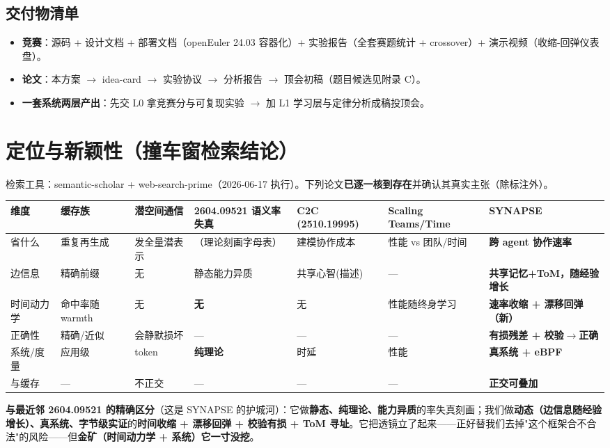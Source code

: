 \documentclass[UTF8,fontset=windows,11pt]{ctexart}
\newcommand{\key}[1]{\textbf{\textcolor{NavyBlue}{#1}}}
\begin{document}
\subsection{交付物清单}
\begin{itemize}
\item \key{竞赛}：源码 + 设计文档 + 部署文档（openEuler 24.03 容器化）+ 实验报告（全套赛题统计 + crossover）+ 演示视频（收缩-回弹仪表盘）。
\item \key{论文}：本方案 $\to$ idea-card $\to$ 实验协议 $\to$ 分析报告 $\to$ 顶会初稿（题目候选见附录 C）。
\item \key{一套系统两层产出}：先交 L0 拿竞赛分与可复现实验 $\to$ 加 L1 学习层与定律分析成稿投顶会。
\end{itemize}

\section{定位与新颖性（撞车窗检索结论）}
检索工具：semantic-scholar + web-search-prime（2026-06-17 执行）。下列论文\textbf{已逐一核到存在}并确认其真实主张（除标注外）。

{\scriptsize
\renewcommand{\arraystretch}{1.25}
\begin{tabularx}{\linewidth}{@{}p{1.4cm}YYYYY Y@{}}
\toprule
\textbf{维度} & \textbf{缓存族} & \textbf{潜空间通信} & \textbf{2604.09521 语义率失真} & \textbf{C2C (2510.19995)} & \textbf{Scaling Teams/Time} & \textbf{SYNAPSE} \\
\midrule
省什么 & 重复再生成 & 发全量潜表示 & （理论刻画字母表） & 建模协作成本 & 性能 vs 团队/时间 & \textbf{跨 agent 协作速率} \\
边信息 & 精确前缀 & 无 & 静态能力异质 & 共享心智(描述) & --- & \textbf{共享记忆+ToM，随经验增长} \\
时间动力学 & 命中率随 warmth & 无 & \textbf{无} & 无 & 性能随终身学习 & \textbf{速率收缩 + 漂移回弹（新）} \\
正确性 & 精确/近似 & 会静默损坏 & --- & --- & --- & \textbf{有损残差 + 校验$\to$正确} \\
系统/度量 & 应用级 & token & \textbf{纯理论} & 时延 & 性能 & \textbf{真系统 + eBPF} \\
与缓存 & --- & 不正交 & --- & --- & --- & \textbf{正交可叠加} \\
\bottomrule
\end{tabularx}}

\medskip
\noindent\textbf{与最近邻 2604.09521 的精确区分}（这是 SYNAPSE 的护城河）：它做\textbf{静态、纯理论、能力异质}的率失真刻画；我们做\textbf{动态（边信息随经验增长）、真系统、字节级实证}的\textbf{时间收缩 + 漂移回弹 + 校验有损 + ToM 寻址}。它把透镜立了起来——正好替我们去掉"这个框架合不合法"的风险——但\textbf{金矿（时间动力学 + 系统）它一寸没挖}。
\end{document}
